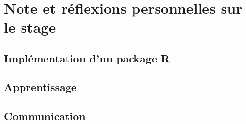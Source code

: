 \chapter{Note et réflexions personnelles sur le stage}

\section{Implémentation d'un package R}

\section{Apprentissage}

\section{Communication}